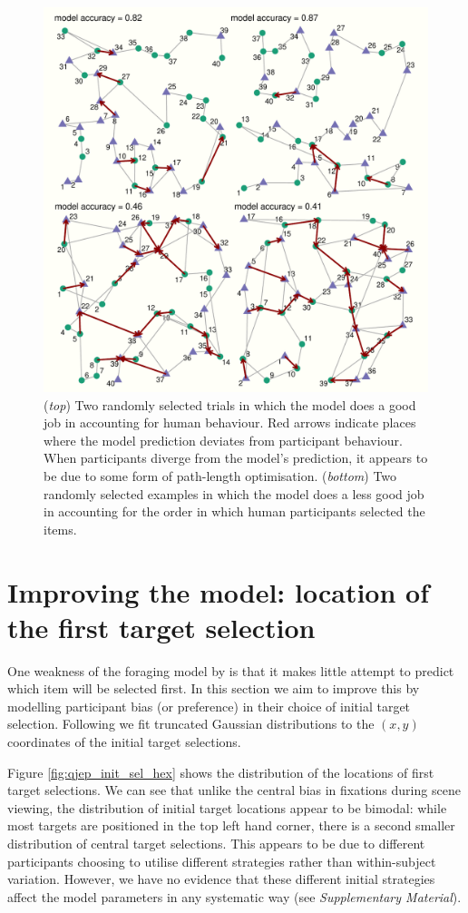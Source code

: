 \documentclass[vision,article,submit,pdftex,moreauthors]{Definitions/mdpi}
\begin{document}
\begin{figure}[H]
\centering
\includegraphics[width=12 cm]{Figures/qjep_ex_paths.pdf}
\caption{(\textit{top}) Two randomly selected trials in which the model does a good job in accounting for human behaviour. Red arrows indicate places where the model prediction deviates from participant behaviour. When participants diverge from the model's prediction, it appears to be due to some form of path-length optimisation. (\textit{bottom}) Two randomly selected examples in which the model does a less good job in accounting for the order in which human participants selected the items.}
\label{fig:qjep_paths}
\end{figure} 

\section{Improving the model: location of the first target selection}

One weakness of the foraging model by \cite{clarke2022foraging} is that it makes little attempt to predict which item will be selected first. In this section we aim to improve this by modelling participant bias (or preference) in their choice of initial target selection. Following \cite{clarke_tatler2014, clarke2017} we fit truncated Gaussian distributions to the $(x,y)$ coordinates of the initial target selections.

Figure \ref{fig:qjep_init_sel_hex} shows the distribution of the locations of first target selections. We can see that unlike the central bias in fixations during scene viewing, the distribution of initial target locations appear to be bimodal: while most targets are positioned in the top left hand corner, there is a second smaller distribution of central target selections. This appears to be due to different participants choosing to utilise different strategies rather than within-subject variation. However, we have no evidence that these different initial strategies affect the model parameters in any systematic way (see \textit{Supplementary Material}).
\end{document}
